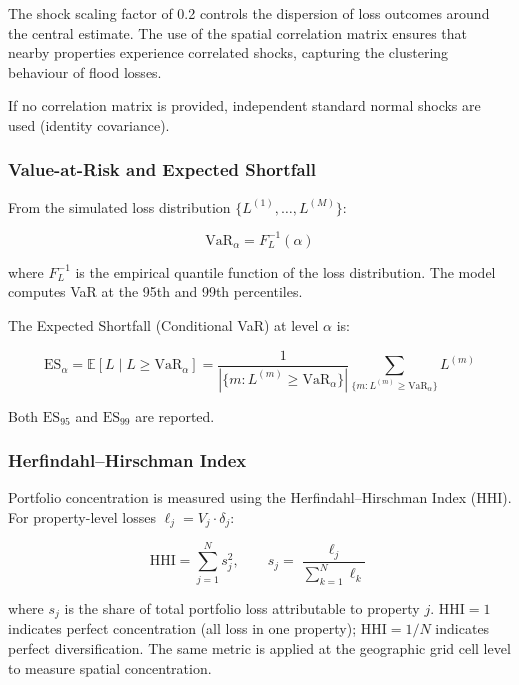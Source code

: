 \documentclass[11pt,a4paper]{article}
\begin{document}
\noindent The shock scaling factor of 0.2 controls the dispersion of loss outcomes around
the central estimate. The use of the spatial correlation matrix ensures that nearby
properties experience correlated shocks, capturing the clustering behaviour of flood
losses.

If no correlation matrix is provided, independent standard normal shocks are used
(identity covariance).

\subsubsection{Value-at-Risk and Expected Shortfall}

From the simulated loss distribution $\{L^{(1)}, \ldots, L^{(M)}\}$:

\begin{equation}
    \text{VaR}_\alpha = F_L^{-1}(\alpha)
    \label{eq:var}
\end{equation}

\noindent where $F_L^{-1}$ is the empirical quantile function of the loss distribution.
The model computes VaR at the 95th and 99th percentiles.

The Expected Shortfall (Conditional VaR) at level $\alpha$ is:

\begin{equation}
    \text{ES}_\alpha = \mathbb{E}\!\left[L \mid L \geq \text{VaR}_\alpha\right]
    = \frac{1}{|\{m : L^{(m)} \geq \text{VaR}_\alpha\}|}
    \sum_{\{m : L^{(m)} \geq \text{VaR}_\alpha\}} L^{(m)}
    \label{eq:es}
\end{equation}

\noindent Both $\text{ES}_{95}$ and $\text{ES}_{99}$ are reported.

\subsubsection{Herfindahl--Hirschman Index}

Portfolio concentration is measured using the Herfindahl--Hirschman Index (HHI). For
property-level losses $\ell_j = V_j \cdot \delta_j$:

\begin{equation}
    \text{HHI} = \sum_{j=1}^{N} s_j^2, \qquad
    s_j = \frac{\ell_j}{\sum_{k=1}^{N} \ell_k}
    \label{eq:hhi}
\end{equation}

\noindent where $s_j$ is the share of total portfolio loss attributable to property $j$.
$\text{HHI} = 1$ indicates perfect concentration (all loss in one property);
$\text{HHI} = 1/N$ indicates perfect diversification. The same metric is applied at the
geographic grid cell level to measure spatial concentration.
\end{document}
